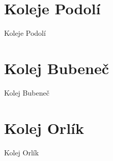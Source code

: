 \documentclass{beamer}
\begin{document}
\section{Koleje Podolí}
\begin{frame}{Koleje Podolí}
\end{frame}

\section{Kolej Bubeneč}
\begin{frame}{Kolej Bubeneč}
\end{frame}

\section{Kolej Orlík}
\begin{frame}{Kolej Orlík}
\end{frame}
\end{document}
